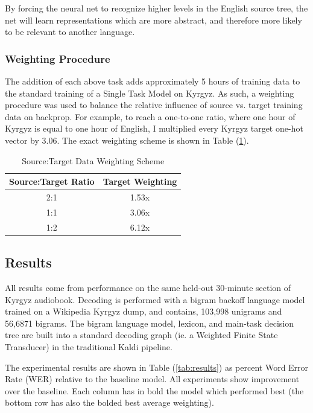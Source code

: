 \documentclass[a4paper]{article}
\begin{document}
By forcing the neural net to recognize higher levels in the English source tree, the net will learn representations which are more abstract, and therefore more likely to be relevant to another language. 


\subsubsection{Weighting Procedure}

The addition of each above task adds approximately 5 hours of training data to the standard training of a Single Task Model on Kyrgyz. As such, a weighting procedure was used to balance the relative influence of source vs. target training data on backprop. For example, to reach a one-to-one ratio, where one hour of Kyrgyz is equal to one hour of English, I multiplied every Kyrgyz target one-hot vector by $3.06$. The exact weighting scheme is shown in Table (\ref{tab:weights}).

\begin{table}[!htbp]
  \centering
  \caption{Source:Target Data Weighting Scheme}
  \label{tab:weights}
  \begin{adjustbox}{width=.33\textwidth}
    \begin{tabular}{cc}
      \toprule
      \textbf{Source:Target Ratio} & \textbf{Target Weighting}\\
      \midrule
      2:1 & 1.53x  \\
      1:1 & 3.06x  \\
      1:2 & 6.12x  \\
      \bottomrule
    \end{tabular}
  \end{adjustbox}
\end{table}




\subsection{Results}


All results come from performance on the same held-out 30-minute section of Kyrgyz audiobook. Decoding is performed with a bigram backoff language model trained on a Wikipedia Kyrgyz dump, and contains, 103,998 unigrams and 56,6871 bigrams. The bigram language model, lexicon, and main-task decision tree are built into a standard decoding graph (ie. a Weighted Finite State Transducer) in the traditional Kaldi pipeline. 

The experimental results are shown in Table (\ref{tab:results}) as percent Word Error Rate (WER) relative to the baseline model. All experiments show improvement over the baseline. Each column has in bold the model which performed best (the bottom row has also the bolded best average weighting).
\end{document}
